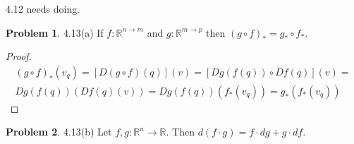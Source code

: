 \documentclass[20pt]{article}
\theoremstyle{plain}
\theoremstyle{definition}
\newtheorem*{problem}{Problem}
\newcommand{\reals}{\mathbb{R}}
\begin{document}
{\color{Blue} 4.12 needs doing.}













































































\begin{problem}{4.13(a)}
  If $f: \reals^{n \to m}$ and $g: \reals^{m \to p}$ then $(g \circ f)_* = g_* \circ f_*$.
\end{problem}

\begin{proof}
  \begin{align*}
      (g \circ f)_*(v_q) = 
      [D(g \circ f)(q)](v) = 
      [Dg(f(q))\circ Df(q)](v) = \\
      Dg(f(q))(Df(q)(v)) = 
      Dg(f(q)) (f_*(v_q)) = g_*(f_*(v_q))
  \end{align*}
\end{proof}


\begin{problem}{4.13(b)}
  Let $f, g : \reals^n \to \reals$. Then $d(f\cdot g) = f \cdot dg  + g \cdot df.$
\end{problem}
\end{document}
